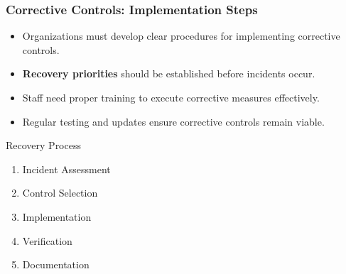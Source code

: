 \documentclass{beamer}
\begin{document}
\begin{frame}
    \frametitle{Corrective Controls: Implementation Steps}
    
    \begin{itemize}
        \item Organizations must develop clear procedures for implementing corrective controls.
        
        \item \textbf{Recovery priorities} should be established before incidents occur.
        
        \item Staff need proper training to execute corrective measures effectively.
        
        \item Regular testing and updates ensure corrective controls remain viable.
    \end{itemize}
    
    \begin{block}{Recovery Process}
        \begin{enumerate}
            \item Incident Assessment
            \item Control Selection
            \item Implementation
            \item Verification
            \item Documentation
        \end{enumerate}
    \end{block}
\end{frame}
\end{document}
